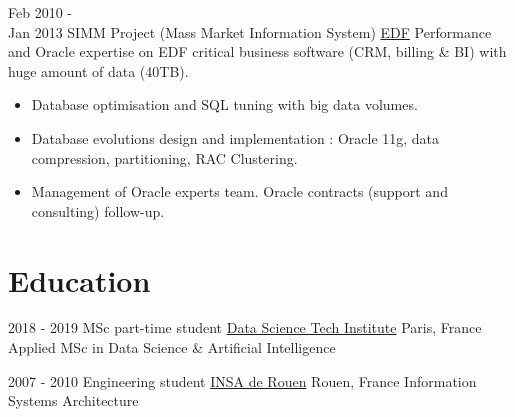 \documentclass[letterpaper]{twentysecondcv} %
\begin{document}
\begin{twenty}
    \twentyitem
   	{Feb 2010 - \\ Jan 2013}
        {SIMM Project (Mass Market Information System)}
        {\href{http://www.edf.fr/}{EDF}}
        {Performance and Oracle expertise on EDF critical business software (CRM, billing \& BI) with huge amount of data (40TB).}
        {
        {\begin{itemize}
        \item Database optimisation and SQL tuning with big data volumes.
        \item Database evolutions design and implementation : Oracle 11g, data compression, partitioning, RAC Clustering.
        \item Management of Oracle experts team. Oracle contracts (support and consulting) follow-up.
    \end{itemize}}
        }
        
        
\end{twenty}

\section{Education}

\begin{twenty} %
	\twentyitem
    	{2018 - 2019}
        {MSc part-time student}
        {\href{http://www.datasciencetech.institute/}{Data Science Tech Institute}}
        {Paris, France}
        {Applied MSc in Data Science \& Artificial Intelligence}
\end{twenty}

\begin{twenty} %
        \twentyitem
        {2007 - 2010}
        {Engineering student}
        {\href{http://www.insa-rouen.fr/}{INSA de Rouen}}
        {Rouen, France}
        {Information Systems Architecture}
\end{twenty}

\end{document}
